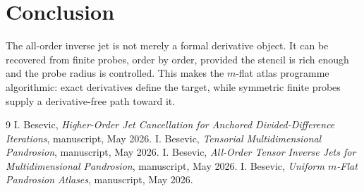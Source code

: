 \documentclass[11pt]{article}
\begin{document}
\section{Conclusion}

The all-order inverse jet is not merely a formal derivative object. It can be recovered from finite probes, order by order, provided the stencil is rich enough and the probe radius is controlled. This makes the \(m\)-flat atlas programme algorithmic: exact derivatives define the target, while symmetric finite probes supply a derivative-free path toward it.

\begin{thebibliography}{9}
I. Besevic, \emph{Higher-Order Jet Cancellation for Anchored Divided-Difference Iterations}, manuscript, May 2026.
I. Besevic, \emph{Tensorial Multidimensional Pandrosion}, manuscript, May 2026.
I. Besevic, \emph{All-Order Tensor Inverse Jets for Multidimensional Pandrosion}, manuscript, May 2026.
I. Besevic, \emph{Uniform \(m\)-Flat Pandrosion Atlases}, manuscript, May 2026.
\end{thebibliography}
\end{document}
